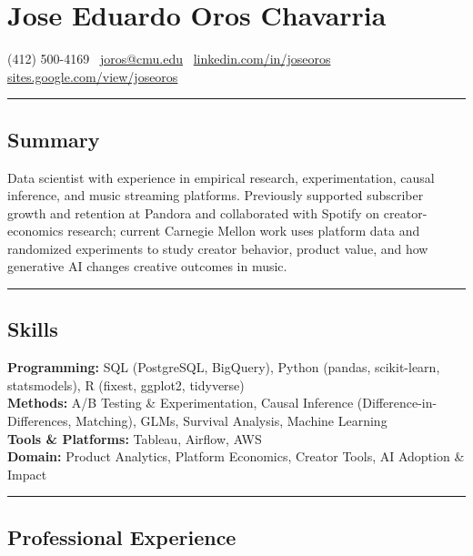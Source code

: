 \documentclass[10pt,letterpaper]{article}
\newcommand{\name}[1]{\section*{#1}}
\newcommand{\sep}{{\color{gray}\,\textbullet\,\,}}
\newcommand{\hsep}{\noindent\textcolor{gray}{\rule{\textwidth}{0.5pt}}}
\newcommand{\block}[1]{\begin{samepage}\hsep\subsection*{#1}\end{samepage}}
\begin{document}
\name{Jose Eduardo Oros Chavarria}

\begin{center}
(412) 500-4169 \sep \href{mailto:joros@cmu.edu}{joros@cmu.edu} \sep \href{https://www.linkedin.com/in/joseoros}{linkedin.com/in/joseoros} \sep \href{https://sites.google.com/view/joseoros}{sites.google.com/view/joseoros}
\end{center}

\block{Summary}

\noindent Data scientist with experience in empirical research, experimentation, causal inference, and music streaming platforms. Previously supported subscriber growth and retention at Pandora and collaborated with Spotify on creator-economics research; current Carnegie Mellon work uses platform data and randomized experiments to study creator behavior, product value, and how generative AI changes creative outcomes in music. 

\block{Skills}

\noindent\textbf{Programming:} SQL (PostgreSQL, BigQuery), Python (pandas, scikit-learn, statsmodels), R (fixest, ggplot2, tidyverse) \\
\textbf{Methods:} A/B Testing \& Experimentation, Causal Inference (Difference-in-Differences, Matching), GLMs, Survival Analysis, Machine Learning \\
\textbf{Tools \& Platforms:} Tableau, Airflow, AWS \\
\textbf{Domain:} Product Analytics, Platform Economics, Creator Tools, AI Adoption \& Impact

\block{Professional Experience}
\end{document}
